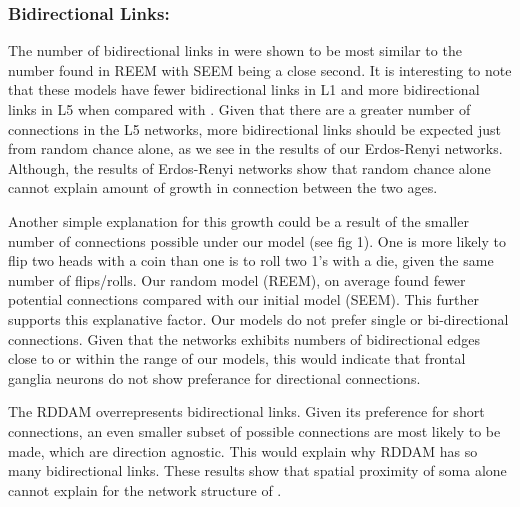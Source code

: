 \subsubsection{Bidirectional Links:} The number of bidirectional links in \ce were shown to be most similar to the number found in REEM with SEEM being a close second. 
It is interesting to note that these models have fewer bidirectional links in L1 and more bidirectional links in L5 when compared with \ce. 
Given that there are a greater number of connections in the L5 networks, more bidirectional links should be expected just from random chance alone, as we see in the results of our Erdos-Renyi networks. 
Although, the results of Erdos-Renyi networks show that random chance alone cannot explain amount of growth in connection between the two ages. 

Another simple explanation for this growth could be a result of the smaller number of connections possible under our model (see fig 1). 
One is more likely to flip two heads with a coin than one is to roll two 1's with a die, given the same number of flips/rolls. 
Our random model (REEM), on average found fewer potential connections compared with our initial model (SEEM). 
This further supports this explanative factor. 
Our models do not prefer single or bi-directional connections.
Given that the \ce networks exhibits numbers of bidirectional edges close to or within the range of our models, this would indicate that \ce frontal ganglia neurons do not show preferance for directional connections.

The RDDAM overrepresents bidirectional links. 
Given its preference for short connections, an even smaller subset of possible connections are most likely to be made, which are direction agnostic. 
This would explain why RDDAM has so many bidirectional links. 
These results show that spatial proximity of soma alone cannot explain for the network structure of \ce.